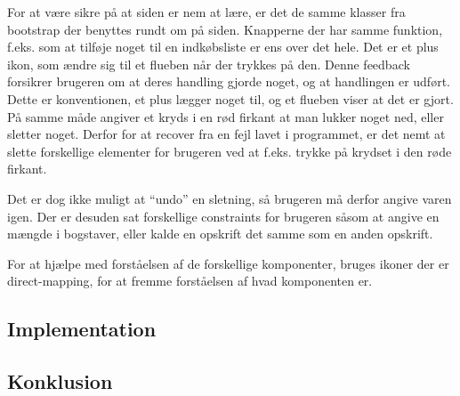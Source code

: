 For at være sikre på at siden er nem at lære, er det de samme klasser fra bootstrap der benyttes rundt om på siden. 
Knapperne der har samme funktion, f.eks. som at tilføje noget til en indkøbsliste er ens over det hele. 
Det er et plus ikon, som ændre sig til et flueben når der trykkes på den.
Denne feedback forsikrer brugeren om at deres handling gjorde noget, og at handlingen er udført.
Dette er konventionen, et plus lægger noget til, og et flueben viser at det er gjort.
På samme måde angiver et kryds i en rød firkant at man lukker noget ned, eller sletter noget.
Derfor for at recover fra en fejl lavet i programmet, er det nemt at slette forskellige elementer for brugeren ved at f.eks. trykke på krydset i den røde firkant.

Det er dog ikke muligt at ``undo'' en sletning, så brugeren må derfor angive varen igen.
Der er desuden sat forskellige constraints for brugeren såsom at angive en mængde i bogstaver, eller kalde en opskrift det samme som en anden opskrift.

For at hjælpe med forståelsen af de forskellige komponenter, bruges ikoner der er direct-mapping, for at fremme forståelsen af hvad komponenten er.

	
	
\subsection{Implementation}
\subsection{Konklusion}